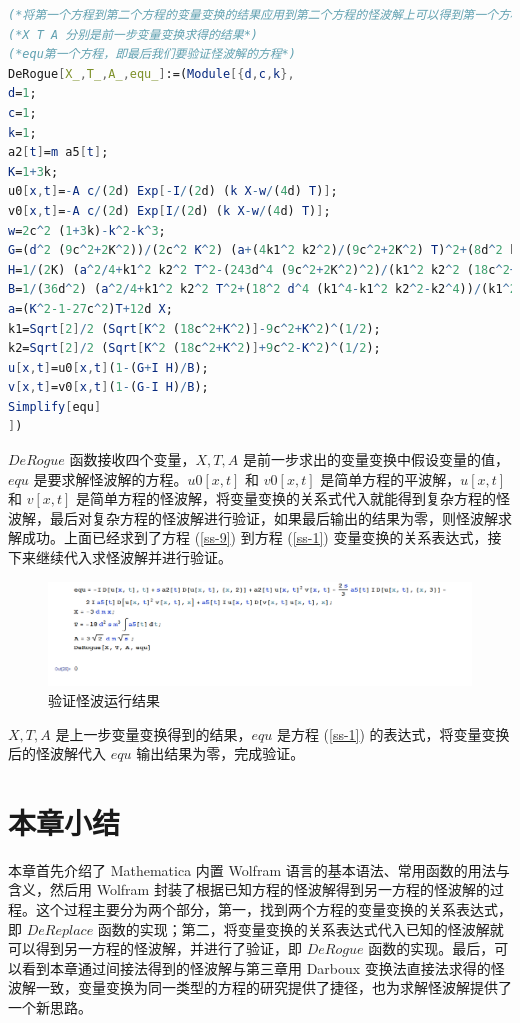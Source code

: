 \begin{lstlisting}[language=Mathematica,caption=验证怪波解]
(*将第一个方程到第二个方程的变量变换的结果应用到第二个方程的怪波解上可以得到第一个方程的怪波解*)
(*X T A 分别是前一步变量变换求得的结果*)
(*equ第一个方程，即最后我们要验证怪波解的方程*)
DeRogue[X_,T_,A_,equ_]:=(Module[{d,c,k},
d=1;
c=1;
k=1;
a2[t]=m a5[t];
K=1+3k;
u0[x,t]=-A c/(2d) Exp[-I/(2d) (k X-w/(4d) T)];
v0[x,t]=-A c/(2d) Exp[I/(2d) (k X-w/(4d) T)];
w=2c^2 (1+3k)-k^2-k^3;
G=(d^2 (9c^2+2K^2))/(2c^2 K^2) (a+(4k1^2 k2^2)/(9c^2+2K^2) T)^2+(8d^2 k1^2 k2^2 (k1^2-k2^2))/(c^2 (9c^2+2K^2)) T^2+(162d^6 (9c^2+2K^2)^3)/(c^2 k1^2 k2^2 (k1^2+k2^2)^2);
H=1/(2K) (a^2/4+k1^2 k2^2 T^2-(243d^4 (9c^2+2K^2)^2)/(k1^2 k2^2 (18c^2+K^2)))(a+(4k1^2 k2^2)/(9c^2) T)+(16d^4 k1^2 k2^2 (27c^2+2K^2))/(c^4 K(18c^2+K^2)) T;
B=1/(36d^2) (a^2/4+k1^2 k2^2 T^2+(18^2 d^4 (k1^4-k1^2 k2^2-k2^4))/(k1^2 k2^2 (k1^2+k2^2)))^2+(9d^2 k2^2)/(k1^2+k2^2)^2 (a+2k1^2 T)^2+(108^2 d^6)/(k2^2 (k1^2+k2^2));
a=(K^2-1-27c^2)T+12d X;
k1=Sqrt[2]/2 (Sqrt[K^2 (18c^2+K^2)]-9c^2+K^2)^(1/2);
k2=Sqrt[2]/2 (Sqrt[K^2 (18c^2+K^2)]+9c^2-K^2)^(1/2);
u[x,t]=u0[x,t](1-(G+I H)/B);
v[x,t]=v0[x,t](1-(G-I H)/B);
Simplify[equ]
])
\end{lstlisting}
$DeRogue$ 函数接收四个变量，$X, T, A$ 是前一步求出的变量变换中假设变量的值，$equ$ 是要求解怪波解的方程。$u0[x,t]$ 和 $v0[x,t]$ 是简单方程的平波解，$u[x,t]$ 和 $v[x,t]$ 是简单方程的怪波解，将变量变换的关系式代入就能得到复杂方程的怪波解，最后对复杂方程的怪波解进行验证，如果最后输出的结果为零，则怪波解求解成功。上面已经求到了方程 (\ref{ss-9}) 到方程 (\ref{ss-1}) 变量变换的关系表达式，接下来继续代入求怪波解并进行验证。
\begin{figure}[!htp]
	\centering
	\includegraphics[width=\linewidth]{rogueResult.jpg}
	\caption{验证怪波运行结果}
	\label{}
\end{figure}
$X, T, A$ 是上一步变量变换得到的结果，$equ$ 是方程 (\ref{ss-1}) 的表达式，将变量变换后的怪波解代入 $equ$ 输出结果为零，完成验证。
\section{本章小结}
本章首先介绍了 Mathematica 内置 Wolfram 语言的基本语法、常用函数的用法与含义，然后用 Wolfram 封装了根据已知方程的怪波解得到另一方程的怪波解的过程。这个过程主要分为两个部分，第一，找到两个方程的变量变换的关系表达式，即 $DeReplace$ 函数的实现；第二，将变量变换的关系表达式代入已知的怪波解就可以得到另一方程的怪波解，并进行了验证，即 $DeRogue$ 函数的实现。最后，可以看到本章通过间接法得到的怪波解与第三章用 Darboux 变换法直接法求得的怪波解一致，变量变换为同一类型的方程的研究提供了捷径，也为求解怪波解提供了一个新思路。


